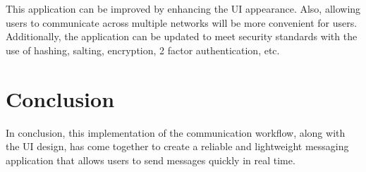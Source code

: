 \documentclass{article}
\begin{document}
This application can be improved by enhancing the UI appearance. Also, allowing users to communicate across multiple networks will be more convenient for users. Additionally, the application can be updated to meet security standards with the use of hashing, salting, encryption, 2 factor authentication, etc.

\section{Conclusion}
 
In conclusion, this implementation of the communication workflow, along with the UI design, has come together to create a reliable and lightweight messaging application that allows users to send messages quickly in real time.
\end{document}
